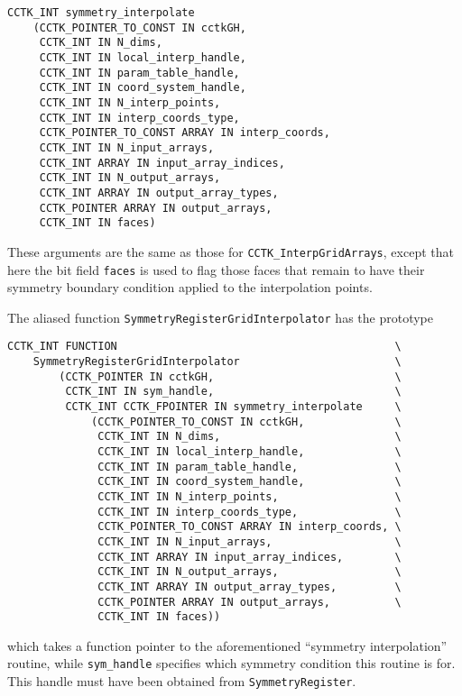 \begin{verbatim}
CCTK_INT symmetry_interpolate
    (CCTK_POINTER_TO_CONST IN cctkGH,
     CCTK_INT IN N_dims,
     CCTK_INT IN local_interp_handle,
     CCTK_INT IN param_table_handle,
     CCTK_INT IN coord_system_handle,
     CCTK_INT IN N_interp_points,
     CCTK_INT IN interp_coords_type,
     CCTK_POINTER_TO_CONST ARRAY IN interp_coords,
     CCTK_INT IN N_input_arrays,
     CCTK_INT ARRAY IN input_array_indices,
     CCTK_INT IN N_output_arrays,
     CCTK_INT ARRAY IN output_array_types,
     CCTK_POINTER ARRAY IN output_arrays,
     CCTK_INT IN faces)
\end{verbatim}

These arguments are the same as those for \texttt{CCTK\_InterpGridArrays},
except that here the bit field \texttt{faces} is used to flag those faces
that remain to have their symmetry boundary condition applied to the
interpolation points. 

The aliased function \texttt{SymmetryRegisterGridInterpolator} has the
prototype

\begin{verbatim}
CCTK_INT FUNCTION                                           \
    SymmetryRegisterGridInterpolator                        \
        (CCTK_POINTER IN cctkGH,                            \
         CCTK_INT IN sym_handle,                            \
         CCTK_INT CCTK_FPOINTER IN symmetry_interpolate     \
             (CCTK_POINTER_TO_CONST IN cctkGH,              \
              CCTK_INT IN N_dims,                           \
              CCTK_INT IN local_interp_handle,              \
              CCTK_INT IN param_table_handle,               \
              CCTK_INT IN coord_system_handle,              \
              CCTK_INT IN N_interp_points,                  \
              CCTK_INT IN interp_coords_type,               \
              CCTK_POINTER_TO_CONST ARRAY IN interp_coords, \
              CCTK_INT IN N_input_arrays,                   \
              CCTK_INT ARRAY IN input_array_indices,        \
              CCTK_INT IN N_output_arrays,                  \
              CCTK_INT ARRAY IN output_array_types,         \
              CCTK_POINTER ARRAY IN output_arrays,          \
              CCTK_INT IN faces))
\end{verbatim}

which takes a function pointer to the aforementioned ``symmetry
interpolation'' routine, while \texttt{sym\_handle} specifies which
symmetry condition this routine is for.  This handle must have been
obtained from \texttt{SymmetryRegister}.

